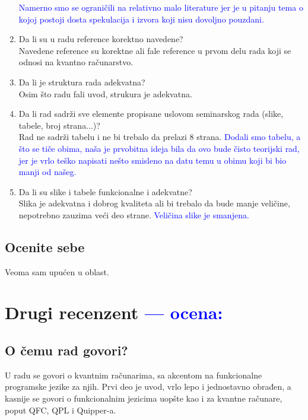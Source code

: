 \documentclass[a4paper]{report}
\newcommand{\odgovor}[1]{\textcolor{blue}{#1}}
\begin{document}
\begin{enumerate}
\odgovor {Namerno smo se ograničili na relativno malo literature jer je u pitanju tema o kojoj postoji dosta spekulacija i izvora koji nisu dovoljno pouzdani.}
\item Da li su u radu reference korektno navedene?\\
Navedene reference su korektne ali fale reference u prvom delu rada koji se odnosi na kvantno računarstvo. 
\item Da li je struktura rada adekvatna?\\
Osim što radu fali uvod, strukura je adekvatna.
\item Da li rad sadrži sve elemente propisane uslovom seminarskog rada (slike, tabele, broj strana...)?\\
Rad ne sadrži tabelu i ne bi trebalo da prelazi 8 strana.
\odgovor {Dodali smo tabelu, a što se tiče obima, naša je prvobitna ideja bila da ovo bude čisto teorijski rad, jer je vrlo teško napisati nešto smisleno na datu temu u obimu koji bi bio manji od našeg.}
\item Da li su slike i tabele funkcionalne i adekvatne?\\
Slika je adekvatna i dobrog kvaliteta ali bi trebalo da bude manje veličine, nepotrebno zauzima veći deo strane.
\odgovor {Veličina slike je smanjena.}
\end{enumerate}

\section{Ocenite sebe}

Veoma sam upućen u oblast.

\chapter{Drugi recenzent \odgovor{--- ocena: } }

\section{O čemu rad govori?}
U radu se govori o kvantnim računarima, sa akcentom na funkcionalne programske jezike za njih. 
Prvi deo je uvod, vrlo lepo i jednostavno obrađen, a kasnije se govori o 
funkcionalnim jezicima uopšte kao i za kvantne računare, poput QFC, QPL i Quipper-a. 
\end{document}
